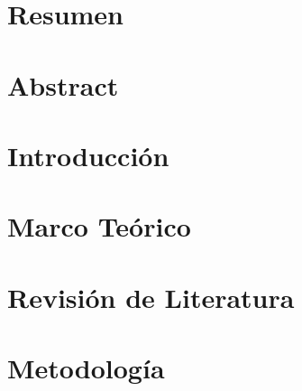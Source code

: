 \documentclass[12pt, twoside, openany]{book}
\begin{document}


    \chapter*{\centering Resumen}
    \label{chap:resumen}
    

    \chapter*{\centering Abstract}
    \label{chap:abstract}
    

    \tableofcontents
    \printglossaries \listoftables \listoffigures

    \mainmatter

    \newpage

    \chapter{Introducción}
    \label{chap:intro}
    

    \chapter{Marco Teórico}
    \label{chap:theory}
    

    \chapter{Revisión de Literatura}
    \label{chap:state_of_art}
    

    \chapter{Metodología}
    \label{chap:methods}
    
\end{document}
